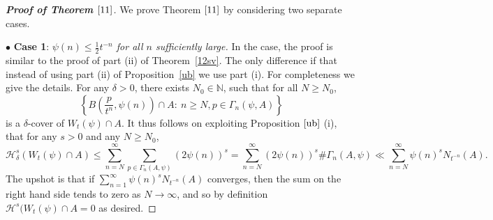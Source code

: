 \documentclass[12pt]{article}
\theoremstyle{definition}
\theoremstyle{remark}
\begin{document}
 
 

\bigskip 



\bigskip 



 
\begin{proof}[\rm \textbf{Proof of Theorem $\ref{11}$}] 
We prove Theorem $\ref{11}$ by considering two separate cases.


\medskip 

\noindent $\bullet$ \textbf{Case 1}: \textit{$\psi(n)\leq\frac{1}{2}t^{-n}$ for all $n$ sufficiently large. }  In the case, the proof  is similar to the proof of part (ii) of Theorem~\ref{12sv}. The only difference if that instead of using part (ii) of Proposition~\ref{ub}  we use part (i).  For completeness we give the details. For any $\delta>0$, there exists $N_{0}\in\mathbb{N}$, such that for all  $N\geq N_{0}$,
$$ \left\{
 B\left(\frac{p}{t^{n}},\psi(n)\right)\cap A: \ n\geq N,p\in\Gamma_{n}(\psi,A)\right\}$$
is a $\delta$-cover of $W_{t}(\psi)\cap A$. It thus follows on exploiting Proposition $\ref{ub}$ (i), that  for any $s>0$ and any $N\geq N_{0}$,
\begin{equation*}
\mathcal{H}_{\delta}^{s}(W_{t}(\psi)\cap A)\leq\sum_{n=N}^{\infty}\sum_{p\in\Gamma_{n}(A,\psi)}(2\psi(n))^{s}=\sum_{n=N}^{\infty}(2\psi(n)) ^{s}\#\Gamma_{n}(A,\psi)\ll\sum_{n=N}^{\infty}\psi(n)^{s}N_{t^{-n}}(A).
\end{equation*}
The upshot is  that if  $\sum_{n=1}^{\infty}\psi(n)^{s}N_{t^{-n}}(A) $ converges,  then the sum on the right hand side tends to zero as $N \to \infty$, and so by definition
$\mathcal{H}^{s}(W_{t}(\psi)\cap A =0    $ as desired. 

\bigskip 




\end{proof}
\end{document}
